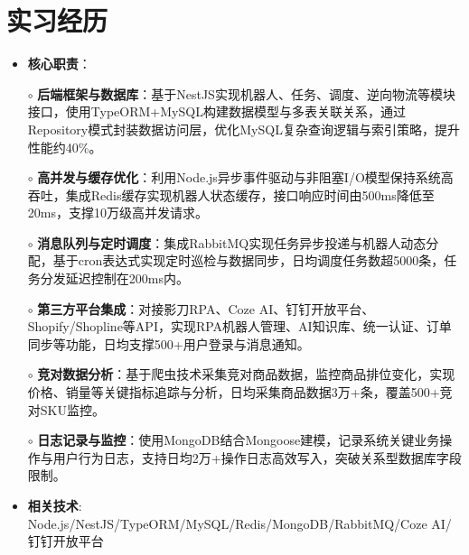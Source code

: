 \section{实习经历}
  \begin{normalsize}
    \begin{itemize}
    \item \textbf{核心职责}：
    \setlength{\itemindent}{1em} %
      \item[$\circ$] \textbf{后端框架与数据库}：基于NestJS实现机器人、任务、调度、逆向物流等模块接口，使用TypeORM+MySQL构建数据模型与多表关联关系，通过Repository模式封装数据访问层，优化MySQL复杂查询逻辑与索引策略，提升性能约40\%。
      \item[$\circ$] \textbf{高并发与缓存优化}：利用Node.js异步事件驱动与非阻塞I/O模型保持系统高吞吐，集成Redis缓存实现机器人状态缓存，接口响应时间由500ms降低至20ms，支撑10万级高并发请求。
      \item[$\circ$] \textbf{消息队列与定时调度}：集成RabbitMQ实现任务异步投递与机器人动态分配，基于cron表达式实现定时巡检与数据同步，日均调度任务数超5000条，任务分发延迟控制在200ms内。
      \item[$\circ$] \textbf{第三方平台集成}：对接影刀RPA、Coze AI、钉钉开放平台、Shopify/Shopline等API，实现RPA机器人管理、AI知识库、统一认证、订单同步等功能，日均支撑500+用户登录与消息通知。
      \item[$\circ$] \textbf{竞对数据分析}：基于爬虫技术采集竞对商品数据，监控商品排位变化，实现价格、销量等关键指标追踪与分析，日均采集商品数据3万+条，覆盖500+竞对SKU监控。
      \item[$\circ$] \textbf{日志记录与监控}：使用MongoDB结合Mongoose建模，记录系统关键业务操作与用户行为日志，支持日均2万+操作日志高效写入，突破关系型数据库字段限制。
    \setlength{\itemindent}{0em} %
    \item \textbf{相关技术}: Node.js/NestJS/TypeORM/MySQL/Redis/MongoDB/RabbitMQ/Coze AI/钉钉开放平台
    \end{itemize}
  \end{normalsize}

